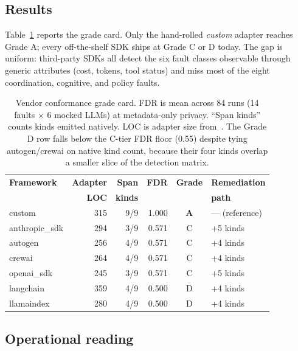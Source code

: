 \documentclass[conference]{IEEEtran}
\begin{document}
\subsection{Results}

Table~\ref{tab:conformance} reports the grade card. Only the
hand-rolled \emph{custom} adapter reaches Grade A; every off-the-shelf
SDK ships at Grade C or D today. The gap is uniform: third-party
SDKs all detect the six fault classes observable through generic
attributes (cost, tokens, tool status) and miss most of the eight
coordination, cognitive, and policy faults.

\begin{table}[t]
\centering
\scriptsize
\caption{Vendor conformance grade card. FDR is mean across 84 runs
(14 faults $\times$ 6 mocked LLMs) at metadata-only privacy. ``Span
kinds'' counts kinds emitted natively. LOC is adapter size
from~\cite{agenttelemetry_aiware}. The Grade D row falls below the
C-tier FDR floor (0.55) despite tying autogen/crewai on native kind
count, because their four kinds overlap a smaller slice of the
detection matrix.}
\label{tab:conformance}
\begin{tabular}{@{}lrrrcl@{}}
\toprule
\textbf{Framework} & \textbf{Adapter} & \textbf{Span} & \textbf{FDR} & \textbf{Grade} & \textbf{Remediation} \\
 & \textbf{LOC} & \textbf{kinds} &  &  & \textbf{path} \\
\midrule
custom        & 315 & 9/9 & 1.000 & \textbf{A} & --- (reference) \\
anthropic\_sdk & 294 & 3/9 & 0.571 & C & +5 kinds \\
autogen       & 256 & 4/9 & 0.571 & C & +4 kinds \\
crewai        & 264 & 4/9 & 0.571 & C & +4 kinds \\
openai\_sdk   & 245 & 3/9 & 0.571 & C & +5 kinds \\
langchain     & 359 & 4/9 & 0.500 & D & +4 kinds \\
llamaindex    & 280 & 4/9 & 0.500 & D & +4 kinds \\
\bottomrule
\end{tabular}
\end{table}

\subsection{Operational reading}
\end{document}
